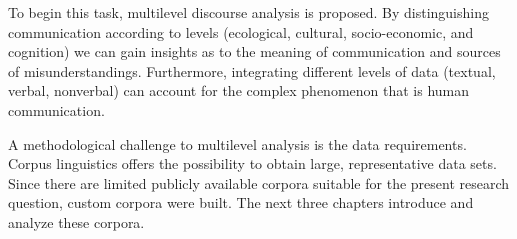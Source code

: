 To begin this task, multilevel discourse analysis is proposed. By distinguishing communication according to levels (ecological, cultural, socio-economic, and cognition) we can gain insights as to the meaning of communication and sources of misunderstandings. Furthermore, integrating different levels of data (textual, verbal, nonverbal) can account for the complex phenomenon that is human communication.

A methodological challenge to multilevel analysis is the data requirements. Corpus linguistics offers the possibility to obtain large, representative data sets. Since there are limited publicly available corpora suitable for the present research question, custom corpora were built. The next three chapters introduce and analyze these corpora.  